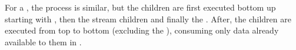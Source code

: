 For a {\splitjoin}, the process is similar, but the children are
first executed bottom up starting with {\joiner}, then the stream
children and finally the {\splitter}. After, the children are
executed from top to bottom (excluding the {\splitter}), consuming
only data already available to them in {\Channels}.

\begin{comment}
Using the sample {\pipeline} from Figure
\ref{fig:hierarchical-schedule}(a), the following are phasing
schedules for {\filters} A, B, C and D:

\begin{displaymath} \small
P_A = \left\{
\begin{array}{c}
T_A = \left\{
\begin{array}{c}
A_{A,0} = \left\{ \{A\}, \left[\begin{array}{c} 1 \\ 1 \\ 3 \end{array}\right]\right\} \\
\end{array}\right\}, \\
I_A = \left\{ \right\},  c_A = \left[ \begin{array}{c} 1 \\ 1 \\
3 \end{array} \right], c^i_B = \left[ \begin{array}{c} 0 \\ 0 \\ 0
\end{array} \right]
\end{array}
\right\}
\end{displaymath}

\begin{displaymath} \small
P_B = \left\{
\begin{array}{c}
T_B = \left\{
\begin{array}{c}
A_{B,0} = \left\{ \{B\}, \left[\begin{array}{c} 3 \\ 2 \\ 3 \end{array}\right]\right\} \\
\end{array}\right\}, \\
I_B = \left\{ A^i_{B,0} = \left\{ \{ \}, \left[\begin{array}{c}1 \\ 0 \\ 0 \end{array}\right]\right\} \right\}, \\
c_B = \left[ \begin{array}{c} 3 \\ 2 \\ 3 \end{array} \right],
c^i_B = \left[ \begin{array}{c} 1 \\ 0 \\ 0
\end{array} \right]
\end{array}
\right\}
\end{displaymath}


\end{comment}
